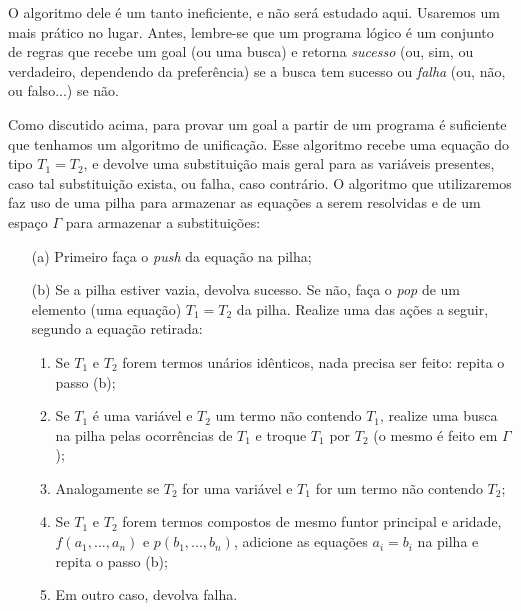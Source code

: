 \documentclass{article}
\theoremstyle{remark}
\theoremstyle{theorem}
\begin{document}
O algoritmo dele é um tanto ineficiente, e não será estudado aqui. Usaremos um mais prático no lugar. Antes, lembre-se que um programa lógico é um conjunto de regras que recebe um goal (ou uma busca) e retorna {\it sucesso} (ou, sim, ou verdadeiro, dependendo da preferência) se a busca tem sucesso ou {\it falha} (ou, não, ou falso...) se não.

Como discutido acima, para provar um goal a partir de um programa é suficiente que tenhamos um algoritmo de unificação. Esse algoritmo recebe uma equação do tipo $T_1 = T_2$, e devolve uma substituição mais geral %
para as variáveis presentes, caso tal substituição exista, ou falha, caso contrário. O algoritmo que utilizaremos faz uso de uma pilha para armazenar as equações a serem resolvidas e de um espaço
$\Gamma$ para armazenar a substituições:

\begin{itemize}
    \item[(a)] Primeiro faça o \textit{push} da equação na pilha;
    \item[(b)] Se a pilha estiver vazia, devolva sucesso. Se não, faça o \textit{pop} de um elemento (uma equação) $T_1 = T_2$ da pilha. Realize uma das ações a seguir, segundo a equação retirada:
      \begin{enumerate}
        \item Se $T_1$ e $T_2$ forem termos unários idênticos, nada precisa ser feito: repita o passo (b);
        \item Se $T_1$ é uma variável e $T_2$ um termo não contendo $T_1$, realize uma busca na pilha pelas ocorrências de $T_1$ e troque $T_1$ por $T_2$ (o mesmo é feito em $\Gamma$); %
        \item Analogamente se $T_2$ for uma variável e $T_1$ for um termo não contendo $T_2$; %
        \item Se $T_1$ e $T_2$ forem termos compostos de mesmo funtor principal e aridade, $f(a_1, ..., a_n)$ e $p(b_1, ..., b_n)$, adicione as equações $a_i = b_i$ na pilha e repita o passo (b);
        \item Em outro caso, devolva falha.
      \end{enumerate}
\end{itemize}
\end{document}

